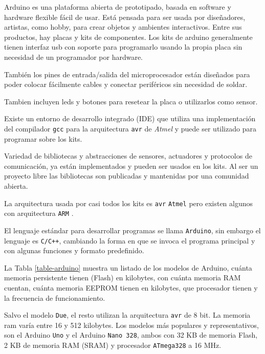 
  Arduino \cite{arduino} es una plataforma abierta de prototipado, basada en
software y hardware flexible fácil de usar.
  Está pensada para ser usada por diseñadores, artistas, como
hobby, para crear objetos y ambientes interactivos.
  Entre sus productos, hay placas y kits de componentes.
  Los kits de arduino generalmente tienen interfaz usb con soporte
para programarlo usando la propia placa sin necesidad de un
programador por hardware.

  También los pines de entrada/salida del microprocesador
están diseñados para poder colocar fácilmente cables y
conectar periféricos sin necesidad de soldar.

  Tambien incluyen leds y botones para resetear la placa o
utilizarlos como sensor.

  Existe un entorno de desarrollo integrado (IDE) que utiliza
una implementación del compilador \texttt{gcc} \cite{gcc} para la arquitectura
\texttt{avr} \cite{avr} de \textit{Atmel} \cite{atmel} y puede ser utilizado
para programar sobre los kits.

  Variedad de bibliotecas y abstracciones de sensores, actuadores y
protocolos de comunicación, ya están implementados y pueden ser
usados en los kits.
  Al ser un proyecto libre las bibliotecas son publicadas y mantenidas
por una comunidad abierta.

  La arquitectura usada por casi todos los kits
es \texttt{avr} \texttt{Atmel} pero existen algunos con
arquitectura \texttt{ARM} \cite{arm}.

  El lenguaje estándar para desarrollar programas se llama \texttt{Arduino},
sin embargo el lenguaje es \texttt{C/C++}, cambiando la forma en que
se invoca el programa principal y con algunas funciones y
formato predefinido.

  La Tabla \ref{table-arduino} muestra un listado de los modelos
de Arduino, cuánta memoria persistente tienen (Flash) en kilobytes, con
cuánta memoria RAM cuentan, cuánta memoria EEPROM tienen en kilobytes,
que procesador tienen y la frecuencia de funcionamiento.

  Salvo el modelo \texttt{Due}, el resto utilizan la
arquitectura \texttt{avr} de 8 bit. La memoria ram varía entre
16 y 512 kilobytes.
  Los modelos más populares y representativos, son el Arduino \texttt{Uno}
y el Arduino \texttt{Nano 328}, ambos con 32 KB de memoria Flash, 2 KB de memoria
RAM (SRAM) y procesador \texttt{ATmega328} a 16 MHz.

